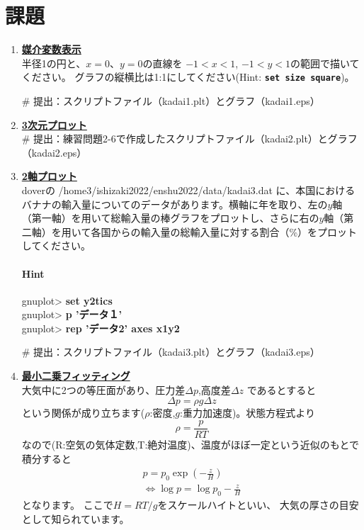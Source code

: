 \documentclass[a4j]{ujarticle} %
\newenvironment{terminal}{%
  \begin{center}
   \begin{minipage}{.8\textwidth}
    \setlength{\FrameSep}{.5\FrameSep}%
    \begin{framed}\ttfamily\small%
     \setlength\baselineskip{.85\baselineskip}%
}{%
    \end{framed}
   \end{minipage}
  \end{center}%
}
\begin{document}
\section{課題}
\begin{enumerate}
\item
\textbf{\underline{媒介変数表示}}\\
半径1の円と、$x=0$、$y=0$の直線を $-1<x<1$, $-1<y<1$の範囲で描いてください。
グラフの縦横比は1:1にしてください(Hint: {\tt\bf set size square})。

\# 提出：スクリプトファイル（kadai1.plt）とグラフ（kadai1.eps）

\item
\textbf{\underline{3次元プロット}}\\
\# 提出：練習問題2-6で作成したスクリプトファイル（kadai2.plt）とグラフ（kadai2.eps）

\item
\textbf{\underline{2軸プロット}}\\
doverの /home3/ishizaki2022/enshu2022/data/kadai3.dat に、本国におけるバナナの輸入量についてのデータがあります。横軸に年を取り、左の$y$軸（第一軸）を用いて総輸入量の棒グラフをプロットし、さらに右の$y$軸（第二軸）を用いて各国からの輸入量の総輸入量に対する割合（\%）をプロットしてください。

\paragraph{Hint}

\begin{terminal}
 gnuplot> {\bf set y2tics}\\
 gnuplot> {\bf p 'データ１'}\\
 gnuplot> {\bf rep 'データ2' axes x1y2}
\end{terminal}
     
\# 提出：スクリプトファイル（kadai3.plt）とグラフ（kadai3.eps）

\item
\textbf{\underline{最小二乗フィッティング}}\\
大気中に2つの等圧面があり、圧力差$\Delta p$,高度差$\Delta z$
であるとすると
\begin{equation}
 \Delta p = \rho g \Delta z \nonumber
\end{equation}
という関係が成り立ちます($\rho$:密度,$g$:重力加速度)。状態方程式より
\begin{equation}
 \rho = \frac{p}{RT} \nonumber
\end{equation}
なので(R:空気の気体定数,T:絶対温度)、温度がほぼ一定という近似のもとで積分すると
\begin{eqnarray}
 p=p_0 \exp{\left(-\frac{z}{H}\right)} \nonumber \\
 \Leftrightarrow \log{p}=\log{p_0}-\frac{z}{H} \nonumber
\end{eqnarray}
となります。
ここで$H=RT/g$をスケールハイトといい、
大気の厚さの目安として知られています。


\end{enumerate}
\end{document}
